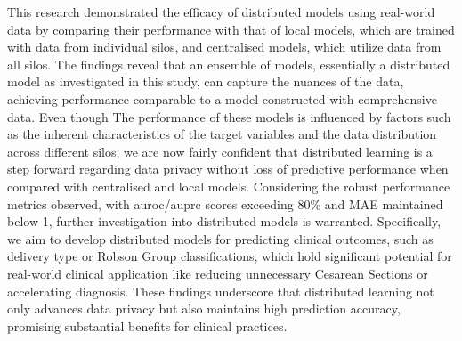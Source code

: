 
This research demonstrated the efficacy of distributed models using real-world data by comparing their performance with that of local models, which are trained with data from individual silos, and centralised models, which utilize data from all silos. The findings reveal that an ensemble of models, essentially a distributed model as investigated in this study, can capture the nuances of the data, achieving performance comparable to a model constructed with comprehensive data. Even though The performance of these models is influenced by factors such as the inherent characteristics of the target variables and the data distribution across different silos, we are now fairly confident that distributed learning is a step forward regarding data privacy without loss of predictive performance when compared with centralised and local models.
Considering the robust performance metrics observed, with \ac{auroc}/\ac{auprc} scores exceeding 80\% and MAE maintained below 1, further investigation into distributed models is warranted. Specifically, we aim to develop distributed models for predicting clinical outcomes, such as delivery type or Robson Group classifications, which hold significant potential for real-world clinical application like reducing unnecessary Cesarean Sections or accelerating diagnosis. These findings underscore that distributed learning not only advances data privacy but also maintains high prediction accuracy, promising substantial benefits for clinical practices.
